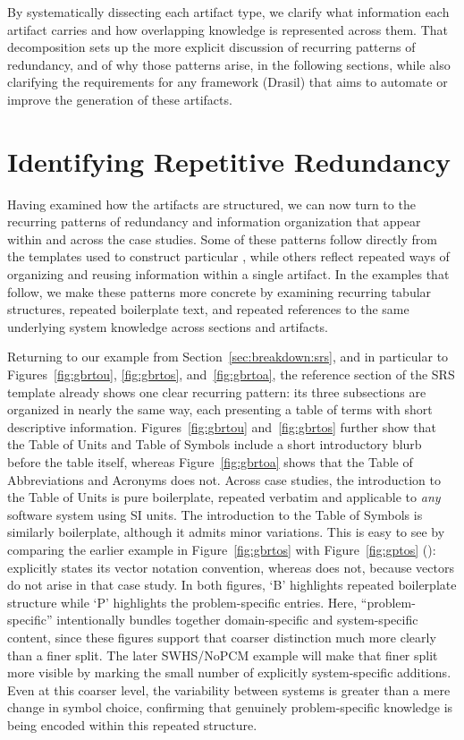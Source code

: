 By systematically dissecting each artifact type, we clarify what information 
each artifact carries and how overlapping knowledge is represented across them. 
That decomposition sets up the more explicit discussion of recurring patterns 
of redundancy, and of why those patterns arise, in the following sections, 
while also clarifying the requirements for any framework (Drasil) that aims to 
automate or improve the generation of these artifacts.

\section{Identifying Repetitive Redundancy}
\label{sec:patterns}

Having examined how the artifacts are structured, we can now turn to the 
recurring patterns of redundancy and information organization that appear 
within and across the case studies. Some of these patterns follow directly from 
the templates used to construct particular \sfs{}, while others reflect 
repeated ways of organizing and reusing information within a single artifact. 
In the examples that follow, we make these patterns more concrete by examining 
recurring tabular structures, repeated boilerplate text, and repeated 
references to the same underlying system knowledge across sections and 
artifacts.

Returning to our example from Section~\ref{sec:breakdown:srs}, and in 
particular to Figures~\ref{fig:gbrtou}, \ref{fig:gbrtos}, 
and~\ref{fig:gbrtoa}, the reference section of the SRS template already shows 
one clear recurring pattern: its three subsections are organized in nearly the 
same way, each presenting a table of terms with short descriptive information. 
Figures~\ref{fig:gbrtou} and~\ref{fig:gbrtos} further show that the Table of 
Units and Table of Symbols include a short introductory blurb before the table 
itself, whereas Figure~\ref{fig:gbrtoa} shows that the Table of 
Abbreviations and Acronyms does not. Across case studies, the introduction to 
the Table of Units is pure boilerplate, repeated verbatim and applicable to 
\emph{any} software system using SI units. The introduction to the Table of 
Symbols is similarly boilerplate, although it admits minor variations. This is 
easy to see by comparing the earlier \gb{} example in Figure~\ref{fig:gbrtos} 
with Figure~\ref{fig:gptos} (\gp{}): \gp{} explicitly states its vector 
notation convention, whereas \gb{} does not, because vectors do not arise in 
that case study. In both figures, `B' highlights repeated boilerplate structure 
while `P' highlights the problem-specific entries. Here, ``problem-specific'' 
intentionally bundles together domain-specific and system-specific content, 
since these figures support that coarser distinction much more clearly than a 
finer split. The later SWHS/NoPCM example will make that finer split more 
visible by marking the small number of explicitly system-specific additions. 
Even at this coarser level, the variability between systems is greater than a 
mere change in symbol choice, confirming that genuinely problem-specific 
knowledge is being encoded within this repeated structure.

